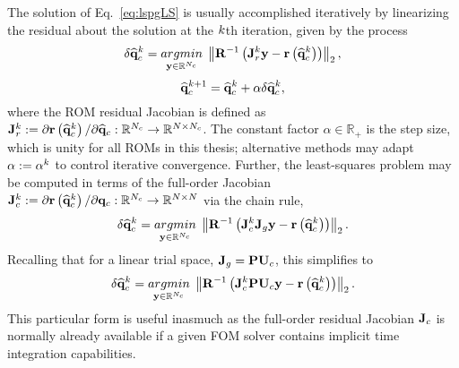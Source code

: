 The solution of Eq.~\ref{eq:lspgLS} is usually accomplished iteratively by linearizing the residual about the solution at the $k$th iteration, given by the process
%
\begin{equation}\label{eq:lspgLSLin}
    \delta \consVecCoef^{\newtonIdx} = \argmin{\dummyVec \inROne{\numConsModes}} \left\Vert \resScaleInv \left(\jacobRes^{\newtonIdx} \dummyVec - \resFunc{\consVecCoef^{\newtonIdx}}\right) \right\Vert_2,
\end{equation}
\begin{equation}
    \mathbf{\widehat{q}}_{c}^{k + 1} = \mathbf{\widehat{q}}_{c}^{k} + \alpha \delta \mathbf{\widehat{q}}_{c}^{k},
\end{equation}
%
where the ROM residual Jacobian is defined as $\mathbf{J}_{r}^{k} := \partial \mathbf{r}\left(\mathbf{\widehat{q}}_{c}^{k}\right) / \partial \mathbf{\widehat{q}}_{c}: \mathbb{R}^{N_c} \rightarrow \mathbb{R}^{N \times N_c}$. The constant factor $\alpha \in \mathbb{R}_+$ is the step size, which is unity for all ROMs in this thesis; alternative methods may adapt $\alpha := \alpha^{k}$ to control iterative convergence. Further, the least-squares problem may be computed in terms of the full-order Jacobian $\mathbf{J}_{c}^{k} := \partial \mathbf{r}\left(\mathbf{\widehat{q}}_{c}^{k}\right) / \partial \mathbf{q}_{c}: \mathbb{R}^{N_c} \rightarrow \mathbb{R}^{N \times N}$ via the chain rule,
%
\begin{equation}
    \delta \consVecCoef^{\newtonIdx} = \argmin{\dummyVec \inROne{\numConsModes}} \left\Vert \resScaleInv \left(\jacobCons^{\newtonIdx} \jacobDecode \dummyVec - \resFunc{\consVecCoef^{\newtonIdx}}\right) \right\Vert_2.
\end{equation}
%
Recalling that for a linear trial space, $\jacobDecode = \consScale \consTrial$, this simplifies to
%
\begin{equation}
    \delta \consVecCoef^{\newtonIdx} = \argmin{\dummyVec \inROne{\numConsModes}} \left\Vert \resScaleInv \left(\jacobCons^{\newtonIdx} \consScale \consTrial \dummyVec - \resFunc{\consVecCoef^{\newtonIdx}}\right) \right\Vert_2.
\end{equation}
%
This particular form is useful inasmuch as the full-order residual Jacobian $\mathbf{J}_{c}$ is normally already available if a given FOM solver contains implicit time integration capabilities.  

